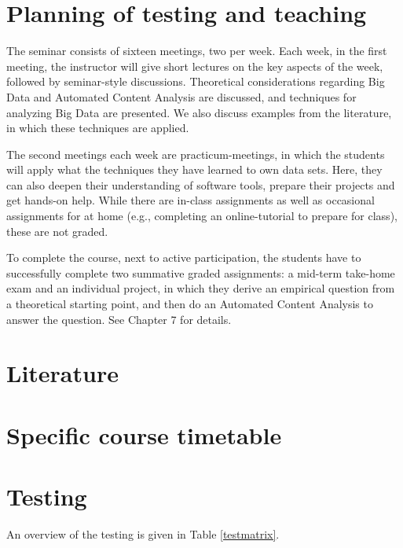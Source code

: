 \documentclass[a4paper,12pt]{report}
\begin{document}
\chapter{Planning of testing and teaching}

The seminar consists of sixteen meetings, two per week. Each week, in the first meeting, the instructor will give short lectures on the key aspects of the week, followed by seminar-style discussions. Theoretical considerations regarding Big Data and Automated Content Analysis are discussed, and techniques for analyzing Big Data are presented. We also discuss examples from the literature, in which these techniques are applied.


The second meetings each week are practicum-meetings, in which the students will apply what the techniques they have learned to own data sets. Here, they can also deepen their understanding of software tools, prepare their projects and get hands-on help. While there are in-class assignments as well as occasional assignments for at home (e.g., completing an online-tutorial to prepare for class), these are not graded.


To complete the course, next to active participation, the students have to successfully complete two summative graded assignments: a mid-term take-home exam and an individual project, in which they derive an empirical question from a theoretical starting point, and then do an Automated Content Analysis to answer the question. See Chapter 7 for details.


\chapter{Literature}




\chapter{Specific course timetable}





\chapter{Testing}
An overview of the testing is given in Table \ref{testmatrix}.
\end{document}
